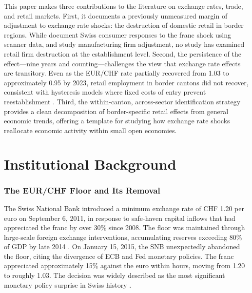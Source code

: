 \documentclass[12pt]{article}
\begin{document}
This paper makes three contributions to the literature on exchange rates, trade, and retail markets. First, it documents a previously unmeasured margin of adjustment to exchange rate shocks: the destruction of domestic retail in border regions. While \citet{Burstein2024} document Swiss consumer responses to the franc shock using scanner data, and \citet{Kaufmann2018} study manufacturing firm adjustment, no study has examined retail firm destruction at the establishment level. Second, the persistence of the effect---nine years and counting---challenges the view that exchange rate effects are transitory. Even as the EUR/CHF rate partially recovered from 1.03 to approximately 0.95 by 2023, retail employment in border cantons did not recover, consistent with hysteresis models where fixed costs of entry prevent reestablishment \citep{Baldwin1990, Dixit1989}. Third, the within-canton, across-sector identification strategy provides a clean decomposition of border-specific retail effects from general economic trends, offering a template for studying how exchange rate shocks reallocate economic activity within small open economies.

\section{Institutional Background}

\subsubsection*{The EUR/CHF Floor and Its Removal} The Swiss National Bank introduced a minimum exchange rate of CHF 1.20 per euro on September 6, 2011, in response to safe-haven capital inflows that had appreciated the franc by over 30\% since 2008. The floor was maintained through large-scale foreign exchange interventions, accumulating reserves exceeding 80\% of GDP by late 2014 \citep{Jordan2016}. On January 15, 2015, the SNB unexpectedly abandoned the floor, citing the divergence of ECB and Fed monetary policies. The franc appreciated approximately 15\% against the euro within hours, moving from 1.20 to roughly 1.03. The decision was widely described as the most significant monetary policy surprise in Swiss history \citep{Auer2015}.
\end{document}
